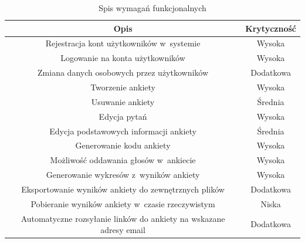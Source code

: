 \documentclass[12pt,a4paper,notitlepage]{article}
\begin{document}
\begin{center}
\begin{table}
\caption{Spis wymagań funkcjonalnych}
  \begin{tabular}{| c| c|}%

    \hline
    Opis & Krytyczność \\ \hline \hline
   Rejestracja kont użytkowników w~systemie	&	Wysoka	\\ \hline
   
   
Logowanie na konta użytkowników	&	Wysoka	\\ \hline


Zmiana danych osobowych przez użytkowników & Dodatkowa	\\ \hline


Tworzenie ankiety 	&	Wysoka	\\ \hline

Usuwanie ankiety & Średnia \\ \hline


Edycja pytań 	&	Wysoka	\\ \hline

Edycja podstawowych informacji ankiety &	Średnia 	\\ \hline


Generowanie kodu ankiety	&	Wysoka	\\ \hline


Możliwość oddawania głosów w~ankiecie 	&	Wysoka	\\ \hline

Generowanie wykresów z~wyników ankiety	&	Wysoka	\\ \hline

Eksportowanie wyników ankiety do zewnętrznych plików	&	Dodatkowa	\\ \hline

Pobieranie wyników ankiety w~czasie rzeczywistym & Niska \\ \hline

Automatyczne rozsyłanie linków do ankiety na wskazane adresy email & Dodatkowa \\ \hline


    \hline
  \end{tabular}
\end{table}
\end{center}
\end{document}
